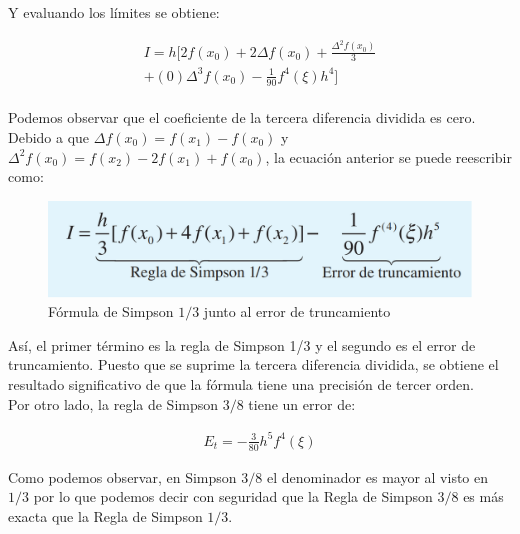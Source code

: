 \documentclass[journal,transmag]{IEEEtran}
\theoremstyle{mytheoremstyle}
\theoremstyle{mytheoremstyle}
\theoremstyle{myproblemstyle}
\begin{document}
        Y evaluando los límites se obtiene: 

        \begin{equation}
            \begin{split}
                I = h[2 f(x_0) + 2 \Delta f(x_0) + \frac{\Delta ^2 f(x_0)}{3} \\
                + (0) \Delta ^3 f(x_0) - \frac{1}{90} f^4(\xi) h^4]
            \end{split}
        \end{equation} \\

        Podemos observar que el coeficiente de la tercera diferencia dividida es cero. Debido a que $\Delta f(x_0) = f(x_1) - f(x_0)$
        y $\Delta ^2 f(x_0) = f(x_2) - 2f(x_1) + f(x_0)$, la ecuación anterior se puede reescribir como: \\
        
        \begin{figure}[H] \label{errorTruncamiento}
            \includegraphics[scale=0.22]{images/error Simpson.png}
            \centering
            \caption{ Fórmula de Simpson $1/3$ junto al error de truncamiento}
        \end{figure}

        Así, el primer término es la regla de Simpson 1/3 y el segundo es el error de truncamiento. Puesto que se suprime la tercera 
        diferencia dividida, se obtiene el resultado significativo de que la fórmula tiene una precisión de tercer orden. \\

        Por otro lado, la regla de Simpson $3/8$ tiene un error de:

        \begin{equation} \tag{33}
            \begin{split}
                E_t = - \frac{3}{80} h^5 f^4(\xi)
            \end{split}
        \end{equation}

        Como podemos observar, en Simpson $3/8$ el denominador es mayor al visto en $1/3$ por lo que podemos decir con seguridad que 
        la Regla de Simpson $3/8$ es más exacta que la Regla de Simpson $1/3$.
\end{document}
